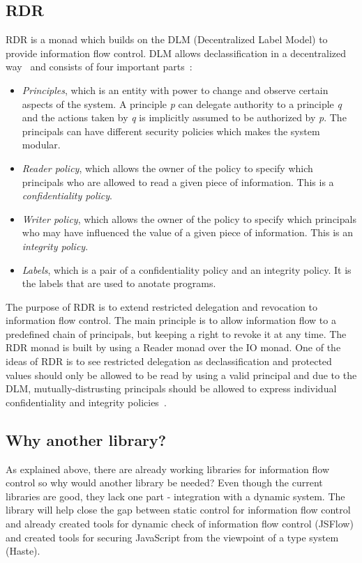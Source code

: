 \subsection{RDR}
RDR is a monad which builds on the DLM (Decentralized Label Model) to provide information flow control. DLM allows declassification in a decentralized way~\cite{dlm} and consists of four important parts~\cite{dlm-site}:
\begin{itemize}
  \item \emph{Principles}, which is an entity with power to change and observe certain aspects of the system. A principle \emph{p} can delegate authority to a principle \emph{q} and the actions taken by \emph{q} is implicitly assumed to be authorized by \emph{p}. The principals can have different security policies which makes the system modular.
  \item \emph{Reader policy}, which allows the owner of the policy to specify which principals who are allowed to read a given piece of information. This is a \emph{confidentiality policy}.
  \item \emph{Writer policy}, which allows the owner of the policy to specify which principals who may have influenced the value of a given piece of information. This is an \emph{integrity policy}.
  \item \emph{Labels}, which is a pair of a confidentiality policy and an integrity policy. It is the labels that are used to anotate programs.
\end{itemize}

The purpose of RDR is to extend restricted delegation and revocation to information flow control. The main principle is to allow information flow to a predefined chain of principals, but keeping a right to revoke it at any time. The RDR monad is built by using a Reader monad over the IO monad. One of the ideas of RDR is to see restricted delegation as declassification and protected values should only be allowed to be read by using a valid principal and due to the DLM, mutually-distrusting principals should be allowed to express individual confidentiality and integrity policies~\cite{rdr}.
\subsection{Why another library?}
As explained above, there are already working libraries for information flow control so why would another library be needed? Even though the current libraries are good, they lack one part - integration with a dynamic system. The library will help close the gap between static control for information flow control and already created tools for dynamic check of information flow control (JSFlow) and created tools for securing JavaScript from the viewpoint of a type system (Haste).


